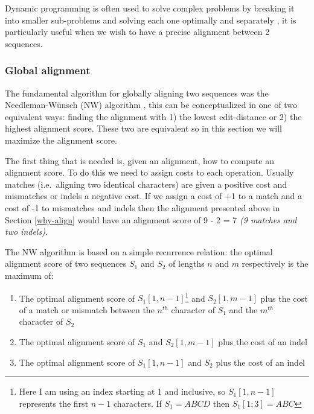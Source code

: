 \documentclass[
  11pt,
  twoside,
  BCOR=10mm,
  listof=totoc]{scrbook}
\begin{document}
Dynamic programming is often used to solve complex problems by breaking it into smaller sub-problems and solving each one optimally and separately \autocite{bradleyAppliedMathematicalProgramming1977,bellmanTheoryDynamicProgramming1954}, it is particularly useful when we wish to have a precise alignment between 2 sequences.

\hypertarget{global-alignment}{%
\subsubsection{Global alignment}\label{global-alignment}}

The fundamental algorithm for globally aligning two sequences was the Needleman-Wünsch (NW) algorithm \autocite{needlemanGeneralMethodApplicable1970}, this can be conceptualized in one of two equivalent ways: finding the alignment with 1) the lowest edit-distance or 2) the highest alignment score. These two are equivalent so in this section we will maximize the alignment score.

The first thing that is needed is, given an alignment, how to compute an alignment score. To do this we need to assign costs to each operation. Usually matches (i.e.~aligning two identical characters) are given a positive cost and mismatches or indels a negative cost. If we assign a cost of +1 to a match and a cost of -1 to mismatches and indels then the alignment presented above in Section \ref{why-align} would have an alignment score of 9 - 2 = 7 \emph{(9 matches and two indels)}.

The NW algorithm is based on a simple recurrence relation: the optimal alignment score of two sequences \(S_1\) and \(S_2\) of lengths \(n\) and \(m\) respectively is the maximum of:

\begin{enumerate}
\def\labelenumi{\arabic{enumi}.}
\item
  The optimal alignment score of \(S_1[1,n-1]\)\footnote{Here I am using an index starting at 1 and inclusive, so \(S_1[1,n-1]\) represents the first \(n-1\) characters. If \(S_1 = ABCD\) then \(S_1[1;3]=ABC\)} and \(S_2[1,m-1]\) plus the cost of a match or mismatch between the \(n^{th}\) character of \(S_1\) and the \(m^{th}\) character of \(S_2\)
\item
  The optimal alignment score of \(S_1\) and \(S_2[1,m-1]\) plus the cost of an indel
\item
  The optimal alignment score of \(S_1[1,n-1]\) and \(S_2\) plus the cost of an indel
\end{enumerate}
\end{document}
